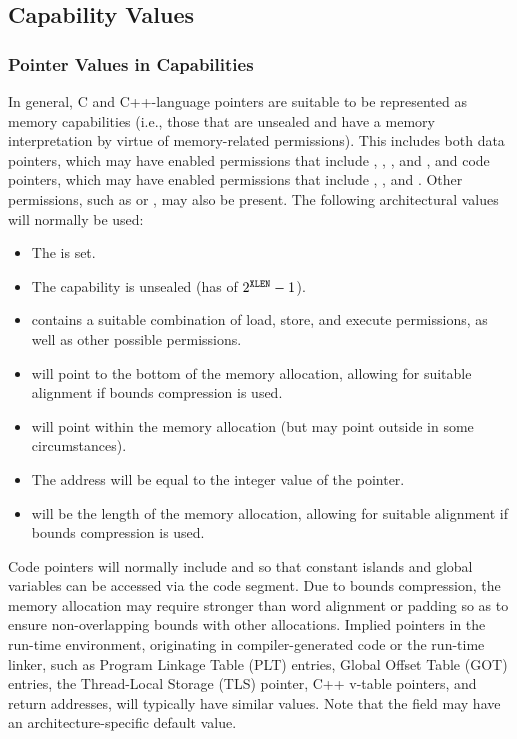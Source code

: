 \subsection{Capability Values}

\subsubsection{Pointer Values in Capabilities}

In general, C and C++-language pointers are suitable to be represented as
memory capabilities (i.e., those that are unsealed and have a memory
interpretation by virtue of memory-related permissions).
This includes both data pointers, which may have enabled permissions that
include \cappermL, \cappermS, \cappermLC, and
\cappermSC, and code pointers, which may have enabled
permissions that include \cappermL, \cappermX, and
\cappermLC.
Other permissions, such as \cappermG or \cappermCInvoke, may also be present.
The following architectural values will normally be used:

\begin{itemize}
\item The \ctag{} is set.
\item The capability is unsealed (has \cotype{} of $2^{{\texttt{XLEN}}{}}-1$).
\item \cperms{} contains a suitable combination of load, store, and
  execute permissions, as well as other possible permissions.
\item \cbase{} will point to the bottom of the memory allocation, allowing for
  suitable alignment if bounds compression is used.
\item \coffset{} will point within the memory allocation (but may point
  outside in some circumstances).
\item The address will be equal to the integer value of the pointer.
\item \clength{} will be the length of the memory allocation, allowing for
  suitable alignment if bounds compression is used.
\end{itemize}

Code pointers will normally include \cappermL and \cappermLC
so that constant islands and global variables can be accessed via the code
segment.
Due to bounds compression, the memory allocation may require stronger than
word alignment or padding so as to ensure non-overlapping bounds with other
allocations.
Implied pointers in the run-time environment, originating in
compiler-generated code or the run-time linker, such as Program Linkage Table
(PLT) entries, Global Offset Table (GOT) entries, the Thread-Local Storage
(TLS) pointer, C++ v-table pointers, and return addresses, will typically have
similar values.
Note that the \cflags{} field may have an architecture-specific default value.

